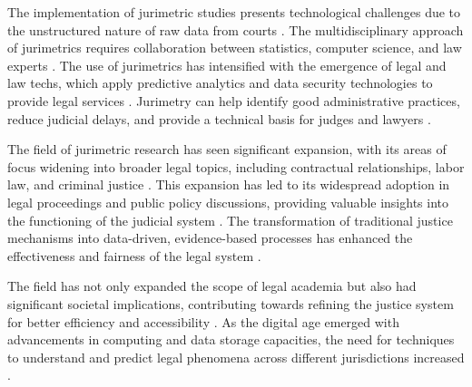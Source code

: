 The implementation of jurimetric studies presents technological challenges due to the unstructured nature of raw data from courts \cite{103390fi9040068}. The multidisciplinary approach of jurimetrics requires collaboration between statistics, computer science, and law experts \cite{103390fi9040068}. The use of jurimetrics has intensified with the emergence of legal and law techs, which apply predictive analytics and data security technologies to provide legal services \cite{silva2023role}. Jurimetry can help identify good administrative practices, reduce judicial delays, and provide a technical basis for judges and lawyers \cite{silva2023role}.

The field of jurimetric research has seen significant expansion, with its areas of focus widening into broader legal topics, including contractual relationships, labor law, and criminal justice \cite{10.1007/s11186-021-09453-1,international2015}. This expansion has led to its widespread adoption in legal proceedings and public policy discussions, providing valuable insights into the functioning of the judicial system \cite{10.1007/s11186-021-09453-1,zabala2019decades,10.3390/fi9040068}. The transformation of traditional justice mechanisms into data-driven, evidence-based processes has enhanced the effectiveness and fairness of the legal system \cite{10.1007/s11186-021-09453-1,10.3390/fi9040068}.

The field has not only expanded the scope of legal academia but also had significant societal implications, contributing towards refining the justice system for better efficiency and accessibility \cite{1023071190721,10.3390/fi9040068,10.1080/07329113.2015.1046739,10.5040/9781350220645,de2010jurimetrics,zabala2019decades,10.1057/s41599-020-00557-0,in the lawviewmetadatacitationsimilarpapers2014,10.1590/dados.2022.65.3.267,10.2307/2654208,demortain2019politics,10.1057/s41599-020-0396-5,10.1007/s11186-021-09453-1,comptabilitat0018,salais2016quantification,10.1017/s0003975609000150,supiot2018,nunes2016jurimetrics,10.1007/s11186-021-09453-1}. As the digital age emerged with advancements in computing and data storage capacities, the need for techniques to understand and predict legal phenomena across different jurisdictions increased \cite{10.5040/9781350220645,zabala2019decades,10.1007/s11186-021-09453-1,unger2021process,10.3390/fi9040068,10.1080/07329113.2015.1046739,10.1590/dados.2022.65.3.267,1023071190721,10.2307/2654208,demortain2019politics,10.1057/s41599-020-0396-5,10.1057/s41599-020-00557-0,comptabilitat0018,salais2016quantification}.

